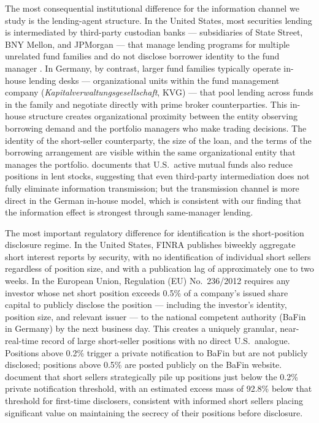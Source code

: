 The most consequential institutional difference for the information channel we study is the lending-agent structure. In the United States, most securities lending is intermediated by third-party custodian banks --- subsidiaries of State Street, BNY Mellon, and JPMorgan --- that manage lending programs for multiple unrelated fund families and do not disclose borrower identity to the fund manager \citep{baklanova_caglio_keane_porter:16}. In Germany, by contrast, larger fund families typically operate in-house lending desks --- organizational units within the fund management company (\textit{Kapitalverwaltungsgesellschaft}, KVG) --- that pool lending across funds in the family and negotiate directly with prime broker counterparties. This in-house structure creates organizational proximity between the entity observing borrowing demand and the portfolio managers who make trading decisions. The identity of the short-seller counterparty, the size of the loan, and the terms of the borrowing arrangement are visible within the same organizational entity that manages the portfolio. \citet{Honkanen2025} documents that U.S.\ active mutual funds also reduce positions in lent stocks, suggesting that even third-party intermediation does not fully eliminate information transmission; but the transmission channel is more direct in the German in-house model, which is consistent with our finding that the information effect is strongest through same-manager lending.

The most important regulatory difference for identification is the short-position disclosure regime. In the United States, FINRA publishes biweekly aggregate short interest reports by security, with no identification of individual short sellers regardless of position size, and with a publication lag of approximately one to two weeks. In the European Union, Regulation (EU) No.\ 236/2012 requires any investor whose net short position exceeds 0.5\% of a company's issued share capital to publicly disclose the position --- including the investor's identity, position size, and relevant issuer --- to the national competent authority (BaFin in Germany) by the next business day. This creates a uniquely granular, near-real-time record of large short-seller positions with no direct U.S.\ analogue. Positions above 0.2\% trigger a private notification to BaFin but are not publicly disclosed; positions above 0.5\% are posted publicly on the BaFin website. \citet{jank_roling_smajlbegovic2020} document that short sellers strategically pile up positions just below the 0.2\% private notification threshold, with an estimated excess mass of 92.8\% below that threshold for first-time disclosers, consistent with informed short sellers placing significant value on maintaining the secrecy of their positions before disclosure.


